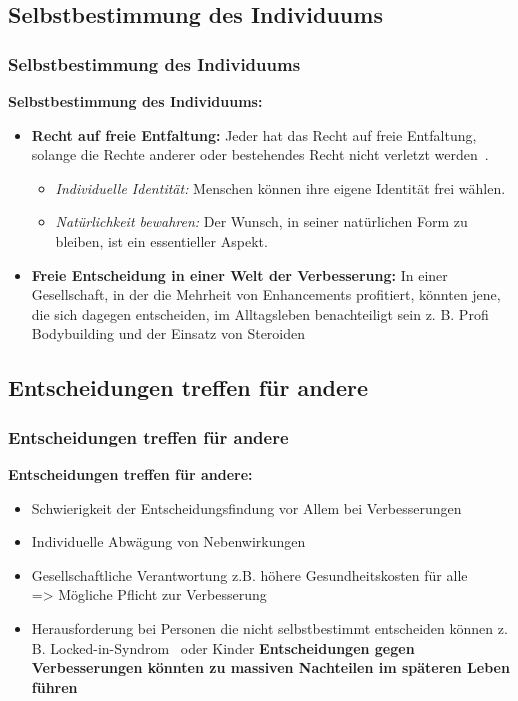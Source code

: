 \documentclass[aspectratio=169,16pt,xcolor=table]{beamer}
\begin{document}
\subsection{Selbstbestimmung des Individuums}
\begin{frame}
  \frametitle{Selbstbestimmung des Individuums}
  \textbf{Selbstbestimmung des Individuums:}
  \begin{itemize}
    \item \textbf{Recht auf freie Entfaltung:} Jeder hat das Recht auf freie Entfaltung, solange die Rechte anderer oder bestehendes Recht nicht verletzt werden~\cite{fur1996grundgesetz}.
    \begin{itemize}
      \item \textit{Individuelle Identität:} Menschen können ihre eigene Identität frei wählen.
      \item \textit{Natürlichkeit bewahren:} Der Wunsch, in seiner natürlichen Form zu bleiben, ist ein essentieller Aspekt.
    \end{itemize}
    \item \textbf{Freie Entscheidung in einer Welt der Verbesserung:} In einer Gesellschaft, in der die Mehrheit von Enhancements profitiert, könnten jene, die sich dagegen entscheiden, im Alltagsleben benachteiligt sein z. B. Profi Bodybuilding und der Einsatz von Steroiden
  \end{itemize}
\end{frame}

\subsection{Entscheidungen treffen für andere}
\begin{frame}
  \frametitle{Entscheidungen treffen für andere}
  \textbf{Entscheidungen treffen für andere:}
  \begin{itemize}
    \item Schwierigkeit der Entscheidungsfindung vor Allem bei Verbesserungen~\cite{plavsienkova2021healthy}
    \item Individuelle Abwägung von Nebenwirkungen
    \item Gesellschaftliche Verantwortung z.B. höhere Gesundheitskosten für alle\\
    => Mögliche Pflicht zur Verbesserung
    \item Herausforderung bei Personen die nicht selbstbestimmt entscheiden können z. B. Locked-in-Syndrom~\cite{das2022locked} oder Kinder
    \textbf{Entscheidungen gegen Verbesserungen könnten zu massiven Nachteilen im späteren Leben führen}
  \end{itemize}
\end{frame}
\end{document}

